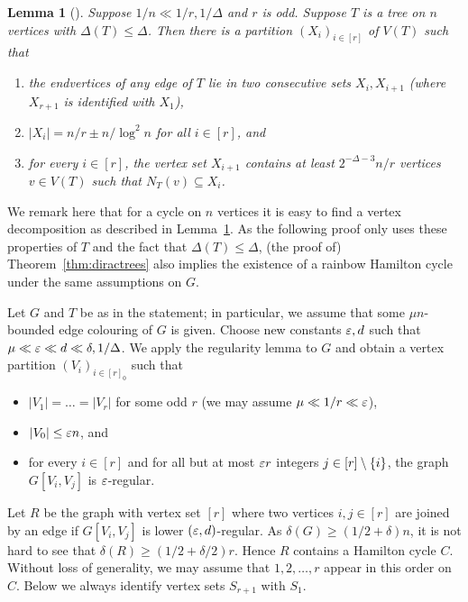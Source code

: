 \documentclass[10pt]{amsart}
\newtheorem{lemma}[algorithm]{Lemma}
\theoremstyle{definition}
\theoremstyle{claimstyle}
\theoremstyle{stepstyle}
\numberwithin{equation}{section}
\def\lateproof#1{\removelastskip\penalty55\medskip\noindent\setcounter{claim}{0}\setcounter{step}{0}{\bf Proof of #1. }} %
\begin{document}
\begin{lemma}[\cite{JKKO:ta}]\label{lem:randomwalk}
Suppose $1/n\ll 1/r, 1/\Delta$ and $r$ is odd.
Suppose $T$ is a tree on $n$ vertices with $\Delta(T)\leq \Delta$.
Then there is a partition $(X_i)_{i\in[r]}$ of $V(T)$
such that
\begin{enumerate}[label={\rm (\roman*)}]
	\item the endvertices of any edge of $T$ lie in two consecutive sets $X_{i},X_{i+1}$ (where $X_{r+1}$ is identified with $X_{1}$),
	\item $|X_i|=n/r\pm n/\log^2 n$ for all $i\in [r]$, and
	\item for every $i\in[r]$,
	the vertex set $X_{i+1}$ contains at least $2^{-\Delta-3}n/r$ vertices $v\in V(T)$ such that $N_T(v)\subseteq X_{i}$.
\end{enumerate}
\end{lemma}

We remark here that for a cycle on $n$ vertices
it is easy to find a vertex decomposition as described in Lemma~\ref{lem:randomwalk}.
As the following proof only uses these properties of $T$ and the fact that $\Delta(T)\leq \Delta$,
(the proof of) Theorem~\ref{thm:diractrees} also implies the existence of a rainbow Hamilton cycle under the same assumptions on $G$.%


\lateproof{Theorem~\ref{thm:diractrees}}
Let $G$ and $T$ be as in the statement; in particular, we assume that some $\mu n$-bounded edge colouring of $G$ is given.
Choose new constants ${\varepsilon},d$ such that $\mu\ll {\varepsilon} \ll d \ll \delta,1/\Delta$.
We apply the regularity lemma to $G$
and obtain a vertex partition $(V_i)_{i\in[r]_0}$
such that
\begin{itemize}
	\item $|V_1|=\ldots = |V_r|$ for some odd $r$ (we may assume $\mu \ll 1/r \ll {\varepsilon}$),
	\item $|V_0| \leq {\varepsilon} n$, and
	\item for every $i\in [r]$ and for all but at most ${\varepsilon} r$ integers $j\in [r]\setminus\{i\}$,
	the graph $G[V_i,V_j]$ is ${\varepsilon}$-regular.
\end{itemize}
Let $R$ be the graph with vertex set $[r]$
where two vertices $i,j\in[r]$ are joined by an edge if $G[V_i,V_j]$ is lower $({\varepsilon},d)$-regular.
As $\delta(G)\geq (1/2+\delta)n$, it is not hard to see
that $\delta(R)\geq (1/2+\delta/2)r$.
Hence $R$ contains a Hamilton cycle $C$. Without loss of generality, we may assume that $1,2,\ldots,r$ appear in this order on~$C$. Below we always identify vertex sets $S_{r+1}$ with $S_1$.
\end{document}
